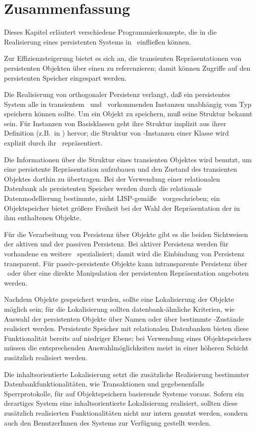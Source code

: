 \section{Zusammenfassung}
%
Dieses Kapitel erl\"{a}utert verschiedene Programmierkonzepte, die in
die Realisierung eines persistenten Systems in \clos\ einflie\ss{}en
k\"{o}nnen.
%
\par Zur Effizienzsteigerung bietet es sich an, die transienten
Repr\"{a}sentationen von persistenten Objekten \"{u}ber einen \cache\/ zu
referenzieren; damit k\"{o}nnen Zugriffe auf den persistenten Speicher
eingespart werden.
%
\par{}Die Realisierung von orthogonaler Persistenz verlangt, da\ss{} ein
persistentes System alle in transientem \cl\ und \clos\ vorkommenden
Instanzen unabh\"{a}ngig vom Typ speichern k\"{o}nnen sollte. Um ein Objekt
zu speichern, mu\ss{} seine Struktur bekannt sein. F\"{u}r Instanzen von
Basisklassen geht ihre Struktur implizit aus ihrer Definition
(z.B.\ in \cite{bib:st90}) hervor; die Struktur von \clos-Instanzen
einer Klasse wird explizit durch ihr \clsmo\ repr\"{a}sentiert.
%
\par{}Die Informationen \"{u}ber die Struktur eines transienten Objektes
wird benutzt, um eine persistente Repr\"{a}sentation aufzubauen und den
Zustand des transienten Objektes dorthin zu \"{u}ber\-tra\-gen. Bei der
Verwendung einer relationalen Datenbank als persistenten Speicher werden
durch die relationale Datenmodellierung bestimmte, nicht LISP-gem\"{a}\ss{}e
\representationforms\ vorgeschrieben; ein Objektspeicher bietet
gr\"{o}\ss{}ere Freiheit bei der Wahl der Repr\"{a}sentation der in ihm
enthaltenen Objekte.
%
\par{}F\"{u}r die Verarbeitung von Persistenz \"{u}ber Objekte gibt es die
beiden Sichtweisen der aktiven und der passiven Persistenz. Bei
aktiver Persistenz werden f\"{u}r vorhandene \gfn{}en weitere
\mtd[n]\ spezialisiert; damit wird die Einbindung von Persistenz
transparent. F\"{u}r passiv-persistente Objekte kann intransparente
Persistenz \"{u}ber \swizzling\ oder \"{u}ber eine direkte Manipulation der
persistenten Repr\"{a}sentation angeboten werden.
%
\par{}Nachdem Objekte gespeichert wurden, sollte eine Lokalisierung
der Objekte m\"{o}glich sein; f\"{u}r die Lokalisierung sollten
datenbank-\"{a}hnliche Kriterien, wie Auswahl der persistenten Objekte
\"{u}ber Namen oder \"{u}ber bestimmte \Slt\/-Zust\"{a}nde realisiert werden.
Persistente Speicher mit relationalen Datenbanken bieten diese
Funktionalit\"{a}t bereits auf niedriger Ebene; bei Verwendung eines
Objektspeichers m\"{u}ssen die entsprechenden Auswahlm\"{o}glichkeiten meist
in einer h\"{o}heren Schicht zus\"{a}tzlich realisiert werden.
%
\par{}Die inhaltsorientierte Lokalisierung setzt die zus\"{a}tzliche
Realisierung bestimmter Datenbankfunktionalit\"{a}ten, wie Transaktionen
und gegebenenfalls Sperrprotokolle, f\"{u}r auf Objektspeichern basierende
Systeme voraus.  Sofern ein derartiges System eine inhaltsorientierte
Lokalisierung realisiert, sollten diese zus\"{a}tzlich realisierten
Funktionalit\"{a}ten nicht nur intern genutzt werden, sondern auch den
BenutzerInnen des Systems zur Verf\"{u}gung gestellt werden.

